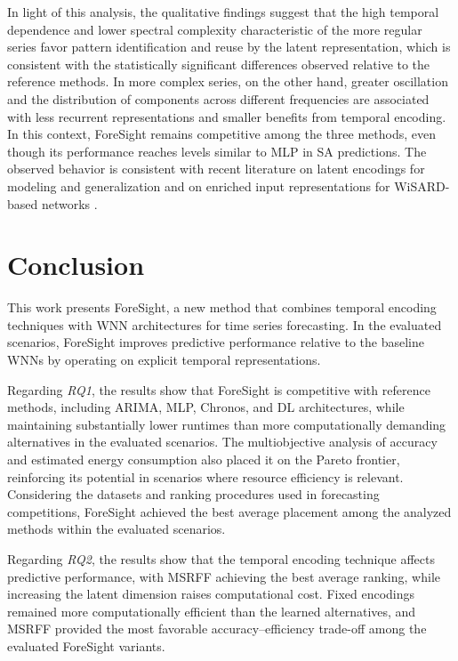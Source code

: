 \documentclass[final,3p,times,twocolumn,authoryear]{elsarticle}
\begin{document}
In light of this analysis, the qualitative findings suggest that the high temporal dependence and lower spectral complexity characteristic of the more regular series favor pattern identification and reuse by the latent representation, which is consistent with the statistically significant differences observed relative to the reference methods. In more complex series, on the other hand, greater oscillation and the distribution of components across different frequencies are associated with less recurrent representations and smaller benefits from temporal encoding. In this context, ForeSight remains competitive among the three methods, even though its performance reaches levels similar to MLP in SA predictions.
The observed behavior is consistent with recent literature on latent encodings for modeling and generalization \citep{trirat_universal_2026, irani_positional_2026} and on enriched input representations for WiSARD-based networks \citep{baby_cawnn_2026}.


\section{Conclusion}
\label{sec_conclusion}


This work presents ForeSight, a new method that combines temporal encoding techniques with WNN architectures for time series forecasting. In the evaluated scenarios, ForeSight improves predictive performance relative to the baseline WNNs by operating on explicit temporal representations.

Regarding \textit{RQ1}, the results show that ForeSight is competitive with reference methods, including ARIMA, MLP, Chronos, and DL architectures, while maintaining substantially lower runtimes than more computationally demanding alternatives in the evaluated scenarios. The multiobjective analysis of accuracy and estimated energy consumption also placed it on the Pareto frontier, reinforcing its potential in scenarios where resource efficiency is relevant. Considering the datasets and ranking procedures used in forecasting competitions, ForeSight achieved the best average placement among the analyzed methods within the evaluated scenarios.

Regarding \textit{RQ2}, the results show that the temporal encoding technique affects predictive performance, with MSRFF achieving the best average ranking, while increasing the latent dimension raises computational cost. Fixed encodings remained more computationally efficient than the learned alternatives, and MSRFF provided the most favorable accuracy--efficiency trade-off among the evaluated ForeSight variants.
\end{document}
